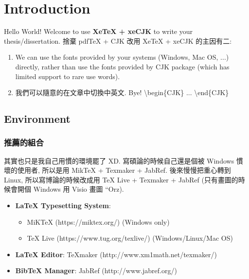 \chapter{Introduction}
\label{chapter:intro}

Hello World! Welcome to use \textbf{XeTeX + xeCJK} to write your thesis/dissertation.
捨棄 pdfTeX + CJK 改用 XeTeX + xeCJK 的主因有二:
\begin{enumerate}

\item We can use the fonts provided by your systems (Windows, Mac OS, ...) directly, rather than use the fonts provided by CJK package (which has limited support to rare use words).

\item 我們可以隨意的在文章中切換中英文.
Bye! \textbackslash begin\{CJK\} ... \textbackslash end\{CJK\}

\end{enumerate}

\section{Environment}

\subsection{推薦的組合}

其實也只是我自己用慣的環境罷了 XD.
寫碩論的時候自己還是個被 Windows 慣壞的使用者, 所以是用 MikTeX + Texmaker + JabRef.
後來慢慢把重心轉到 Linux, 所以寫博論的時候改成用 TeX Live + Texmaker + JabRef (只有畫圖的時候會開個 Windows 用 Visio 畫圖 ``Orz).

\begin{itemize}

\item \textbf{LaTeX Typesetting System}:
  \begin{itemize}
  \item MiKTeX (https://miktex.org/) (Windows only)
  \item TeX Live (https://www.tug.org/texlive/) (Windows/Linux/Mac OS)
  \end{itemize}
\item \textbf{LaTeX Editor}: TeXmaker (http://www.xm1math.net/texmaker/)
\item \textbf{BibTeX Manager}: JabRef (http://www.jabref.org/)

\end{itemize}


